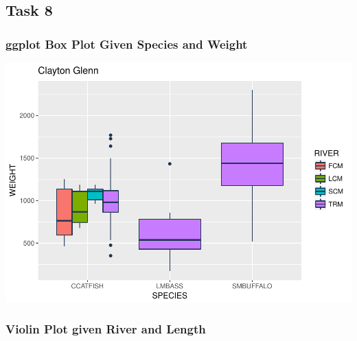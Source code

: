 \documentclass[]{article}
\newenvironment{Shaded}{\begin{snugshade}}{\end{snugshade}}
\newcommand{\KeywordTok}[1]{\textcolor[rgb]{0.13,0.29,0.53}{\textbf{#1}}}
\newcommand{\DataTypeTok}[1]{\textcolor[rgb]{0.13,0.29,0.53}{#1}}
\newcommand{\StringTok}[1]{\textcolor[rgb]{0.31,0.60,0.02}{#1}}
\newcommand{\OperatorTok}[1]{\textcolor[rgb]{0.81,0.36,0.00}{\textbf{#1}}}
\newcommand{\NormalTok}[1]{#1}
\begin{document}
\subsection{Task 8}\label{task-8}

\subsubsection{ggplot Box Plot Given Species and
Weight}\label{ggplot-box-plot-given-species-and-weight}

\begin{Shaded}
\end{Shaded}

\includegraphics{./tex2pdf.8500/c3b6f01f5d7439085684a28b65a9926572c6b645.pdf}

\subsubsection{Violin Plot given River and
Length}\label{violin-plot-given-river-and-length}
\end{document}
